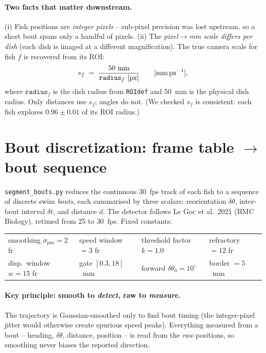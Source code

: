 \documentclass[11pt]{article}
\begin{document}
\paragraph{Two facts that matter downstream.}
(i) Fish positions are \emph{integer pixels} -- sub-pixel precision was lost
upstream, so a short bout spans only a handful of pixels. (ii) The
\emph{pixel$\to$mm scale differs per dish} (each dish is imaged at a different
magnification). The true camera scale for fish $f$ is recovered from its ROI:
\begin{equation}
s_f \;=\; \frac{50~\text{mm}}{\texttt{radius}_f~[\text{px}]}
\qquad[\text{mm\,px}^{-1}],
\label{eq:scale}
\end{equation}
where $\texttt{radius}_f$ is the dish radius from \texttt{ROIdef} and 50~mm is the
physical dish radius. Only distances use $s_f$; angles do not. (We checked $s_f$
is consistent: each fish explores $0.96\pm0.01$ of its ROI radius.)


\section{Bout discretization: frame table $\to$ bout sequence}

\texttt{segment\_bouts.py} reduces the continuous 30~fps track of each fish to a
sequence of discrete swim \emph{bouts}, each summarised by three scalars:
reorientation $\delta\theta$, inter-bout interval $\delta t$, and distance $d$.
The detector follows Le Goc et al.\ 2021 (BMC Biology), retimed from 25 to
30~fps. Fixed constants:
\begin{center}\small
\begin{tabular}{@{}llll@{}}
smoothing $\sigma_{\text{pos}}=2$ fr &
speed window $=3$ fr &
threshold factor $k=1.0$ &
refractory $=12$ fr\\
disp.\ window $w=15$ fr &
gate $[0.3,18]$~mm &
forward $\delta\theta_0=10^\circ$ &
border $=5$~mm\\
\end{tabular}
\end{center}

\paragraph{Key principle: smooth to \emph{detect}, raw to \emph{measure}.}
The trajectory is Gaussian-smoothed only to find bout timing (the integer-pixel
jitter would otherwise create spurious speed peaks). Everything measured from a
bout -- heading, $\delta\theta$, distance, position -- is read from the
\emph{raw} positions, so smoothing never biases the reported direction.
\end{document}
